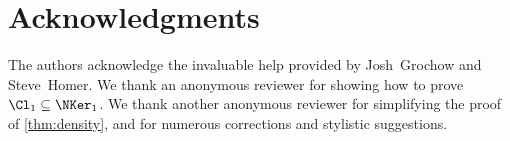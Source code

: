 \section{Acknowledgments}

The authors acknowledge the invaluable help provided by Josh~Grochow and Steve~Homer.
We thank an anonymous reviewer for showing how to prove $\Cl_1 \subseteq \NKer_1$.
We thank another anonymous reviewer for simplifying the proof of \autoref{thm:density}, and for numerous corrections and stylistic suggestions.
